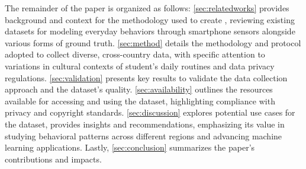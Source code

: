 The remainder of the paper is organized as follows: \cref{sec:relatedworks} provides background and context for the methodology used to create \dataset, reviewing existing datasets for modeling everyday behaviors through smartphone sensors alongside various forms of ground truth. \cref{sec:method} details the methodology and protocol adopted to collect diverse, cross-country data, with specific attention to variations in cultural contexts of student's daily routines and data privacy regulations. \cref{sec:validation} presents key results to validate the data collection approach and the dataset's quality. \cref{sec:availability} outlines the resources available for accessing and using the dataset, highlighting compliance with privacy and copyright standards. \cref{sec:discussion} explores potential use cases for the dataset, provides insights and recommendations, emphasizing its value in studying behavioral patterns across different regions and advancing machine learning applications. Lastly, \cref{sec:conclusion} summarizes the paper’s contributions and impacts.
